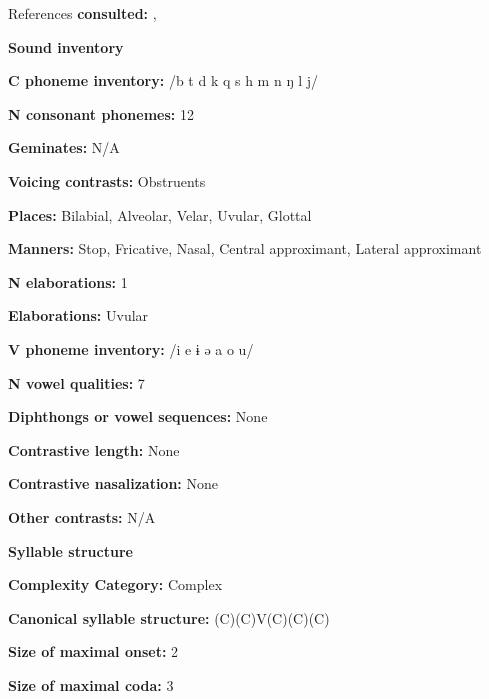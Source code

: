 References \textbf{consulted:} \citet{Georg2007}, \citet{Vajda2000}



\textbf{Sound inventory}



\textbf{C phoneme inventory:} /b t d k q s h m n ŋ l j/



\textbf{N consonant phonemes:} 12



\textbf{Geminates:} N/A



\textbf{Voicing contrasts:} Obstruents



\textbf{Places:} Bilabial, Alveolar, Velar, Uvular, Glottal



\textbf{Manners:} Stop, Fricative, Nasal, Central approximant, Lateral approximant



\textbf{N elaborations:} 1



\textbf{Elaborations:} Uvular



\textbf{V phoneme inventory:} /i e ɨ ə a o u/



\textbf{N vowel qualities:} 7



\textbf{Diphthongs or vowel sequences:} None



\textbf{Contrastive length:} None



\textbf{Contrastive nasalization:} None



\textbf{Other contrasts:} N/A



\textbf{Syllable structure}



\textbf{Complexity Category:} Complex



\textbf{Canonical syllable structure:} (C)(C)V(C)(C)(C) \citep[80-4]{Georg2007}



\textbf{Size of maximal onset:} 2



\textbf{Size of maximal coda:} 3




